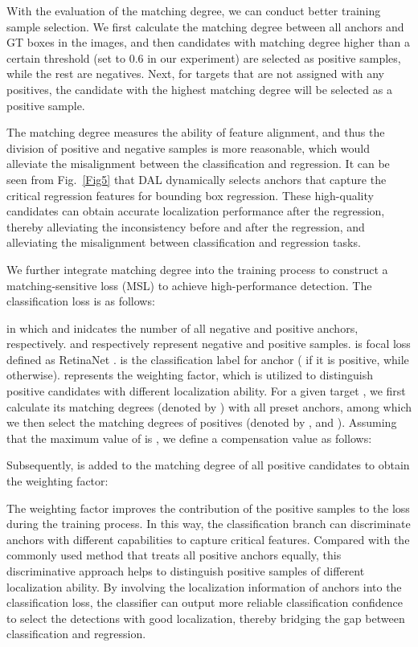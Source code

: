 \documentclass[journal]{IEEEtran}
\begin{document}
With the evaluation of the matching degree, we can conduct better training sample selection. We first calculate the matching degree between all anchors and GT boxes in the images, and then candidates with matching degree higher than a certain threshold (set to 0.6 in our experiment) are selected as positive samples, while the rest are negatives. Next, for targets that are not assigned with any positives, the candidate with the highest matching degree will be selected as a positive sample. 

The matching degree measures the ability of feature alignment, and thus the division of positive and negative samples is more reasonable, which would alleviate the misalignment between the classification and regression. It can be seen from Fig.~\ref{Fig5} that DAL dynamically selects anchors that capture the critical regression features for bounding box regression. These high-quality candidates can obtain accurate localization performance after the regression, thereby alleviating the inconsistency before and after the regression, and alleviating the misalignment between classification and regression tasks. 

We further integrate matching degree into the training process to construct a matching-sensitive loss (MSL) to achieve high-performance detection. The classification loss is as follows:

in which  and   inidcates the number of all negative and positive anchors, respectively.  and   respectively represent negative and positive samples.   is focal loss defined as RetinaNet \cite{lin2017focal}.  is the classification label for anchor ( if it is positive, while  otherwise).  represents the weighting factor, which is utilized to distinguish positive candidates with different localization ability. For a given target , we first calculate its matching degrees (denoted by ) with all preset anchors, among which we then select the matching degrees of positives (denoted by , and ). Assuming that the maximum value of  is , we define a compensation value  as follows:


Subsequently,   is added to the matching degree of all positive candidates to obtain the weighting factor:


The weighting factor improves the contribution of the positive samples to the loss during the training process. In this way, the classification branch can discriminate anchors with different capabilities to capture critical features. Compared with the commonly used method that treats all positive anchors equally, this discriminative approach helps to distinguish positive samples of different localization ability. By involving the localization information of anchors into the classification loss, the classifier can output more reliable classification confidence to select the detections with good localization, thereby bridging the gap between classification and regression.
\end{document}
